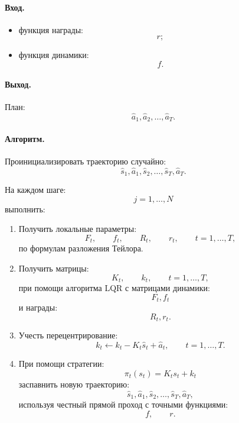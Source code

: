 \documentclass[12pt,a4paper]{article}
\begin{document}
\paragraph{Вход.}

\begin{itemize}
    \item функция награды:
    \[
    r;
    \]

    \item функция динамики:
    \[
    f.
    \]
\end{itemize}

\paragraph{Выход.}

План:
\[
\hat a_1,\hat a_2,\ldots,\hat a_T.
\]

\paragraph{Алгоритм.}

Проинициализировать траекторию случайно:
\[
\hat s_1,\hat a_1,\hat s_2,\ldots,\hat s_T,\hat a_T.
\]

На каждом шаге:
\[
j=1,\ldots,N
\]
выполнить:

\begin{enumerate}
    \item Получить локальные параметры:
    \[
    F_t,
    \qquad
    f_t,
    \qquad
    R_t,
    \qquad
    r_t,
    \qquad
    t=1,\ldots,T,
    \]
    по формулам разложения Тейлора.

    \item Получить матрицы:
    \[
    K_t,
    \qquad
    k_t,
    \qquad
    t=1,\ldots,T,
    \]
    при помощи алгоритма LQR с матрицами динамики:
    \[
    F_t,f_t
    \]
    и награды:
    \[
    R_t,r_t.
    \]

    \item Учесть перецентрирование:
    \[
    k_t
    \leftarrow
    k_t-K_t\hat s_t+\hat a_t,
    \qquad
    t=1,\ldots,T.
    \]

    \item При помощи стратегии:
    \[
    \pi_t(s_t)
    =
    K_ts_t+k_t
    \]
    заспавнить новую траекторию:
    \[
    \hat s_1,\hat a_1,\hat s_2,\ldots,\hat s_T,\hat a_T,
    \]
    используя честный прямой проход с точными функциями:
    \[
    f,
    \qquad
    r.
    \]
\end{enumerate}
\end{document}
